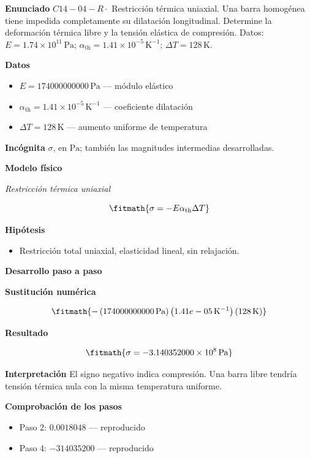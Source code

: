 \documentclass[10pt,openany]{book}
\begin{document}
\begin{tcolorbox}[title={Problema resuelto 4}, studiumworked, breakable]

\noindent\textbf{Enunciado}
\(C14-04-R \cdot\) Restricción térmica uniaxial. Una barra homogénea tiene impedida completamente su dilatación longitudinal. Determine la deformación térmica libre y la tensión elástica de compresión. Datos: \(E=1.74\times 10^{11}\, \mathrm{Pa}\); \(\alpha_{\mathrm{th}}=1.41\times 10^{-5}\, \mathrm{K}^{-1}\); \(\Delta T=128\, \mathrm{K}\).

\noindent\textbf{Datos}
\begin{itemize}
\item $E = 174000000000\,\mathrm{Pa}$ — módulo elástico
\item $\alpha_{\mathrm{th}} = 1.41\times 10^{-5}\,\mathrm{K}^{-1}$ — coeficiente dilatación
\item $\Delta T = 128\,\mathrm{K}$ — aumento uniforme de temperatura
\end{itemize}

\noindent\textbf{Incógnita}
$\sigma$, en $\mathrm{Pa}$; también las magnitudes intermedias desarrolladas.

\noindent\textbf{Modelo físico}

\noindent\textit{Restricción térmica uniaxial}

\[
\fitmath{\sigma=- E \alpha_{\mathrm{th}} \Delta T}
\]

\noindent\textbf{Hipótesis}
\begin{itemize}
\item Restricción total uniaxial, elasticidad lineal, sin relajación.
\end{itemize}

\noindent\textbf{Desarrollo paso a paso}



\noindent\textbf{Sustitución numérica}

\[
\fitmath{- \left(174000000000\,\mathrm{Pa}\right) \left(1.41e-05\,\mathrm{K}^{-1}\right) \left(128\,\mathrm{K}\right)}
\]

\noindent\textbf{Resultado}

\[
\fitmath{\sigma=-3.140352000\times10^{8}\,\mathrm{Pa}}
\]

\noindent\textbf{Interpretación}
El signo negativo indica compresión. Una barra libre tendría tensión térmica nula con la misma temperatura uniforme.

\noindent\textbf{Comprobación de los pasos}
\begin{itemize}
\item Paso 2: $0.0018048$ — reproducido
\item Paso 4: $-314035200$ — reproducido
\end{itemize}


\end{tcolorbox}
\end{document}
